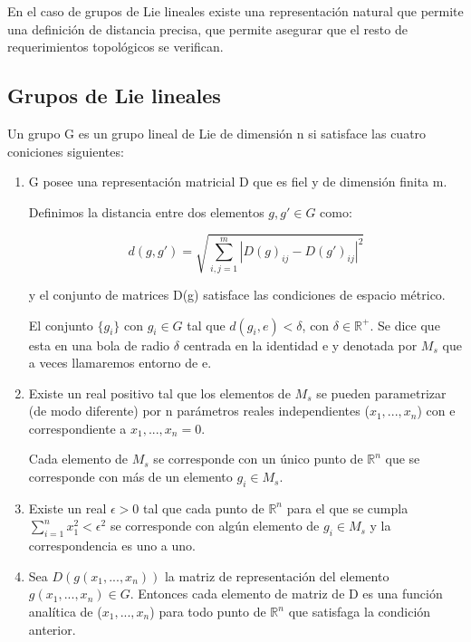\documentclass{article}
\begin{document}
En el caso de grupos de Lie lineales existe una representación natural que permite una definición de distancia precisa, que permite asegurar que el resto de requerimientos topológicos se verifican.

\subsection{Grupos de Lie lineales}

Un grupo G es un grupo lineal de Lie de dimensión n si satisface las cuatro coniciones siguientes:

\begin{enumerate}
\item G posee una representación matricial D que es fiel y de dimensión finita m.

Definimos la distancia entre dos elementos $g,g'\in G$ como:

$$d(g,g')=\sqrt{\sum _{i,j=1}^m |D(g)_{ij}-D(g')_{ij}|^2}$$

y el conjunto de matrices D(g) satisface las condiciones de espacio métrico.

El conjunto $\lbrace g_i\rbrace$ con $g_i \in G$ tal que $d(g_i,e)<\delta$, con $\delta \in \mathds{R}^+$. Se dice que esta en una bola de radio $\delta$ centrada en la identidad e y denotada por $M_s$ que a veces llamaremos entorno de e.

\item Existe un real positivo tal que los elementos de $M_s$ se pueden parametrizar (de modo diferente) por n parámetros reales independientes ($x_1,...,x_n$) con e correspondiente a $x_1,...,x_n=0$.

Cada elemento de $M_s$ se corresponde con un único punto de $\mathds{R}^n$ que se corresponde con más de un elemento $g_i\in M_s$.

\item Existe un real $\epsilon >0$ tal que cada punto de $\mathds{R}^n$ para el que se cumpla $\sum _{i=1}^n x_1^2 < \epsilon ^2$ se corresponde con algún elemento de $g_i \in M_s$ y la correspondencia es uno a uno.

\item Sea $D(g(x_1,...,x_n))$ la matriz de representación del elemento $g(x_1,...,x_n)\in G$. Entonces cada elemento de matriz de D es una función analítica de ($x_1,...,x_n$) para todo punto de $\mathds{R}^n$ que satisfaga la condición anterior.

\end{enumerate}
\end{document}
